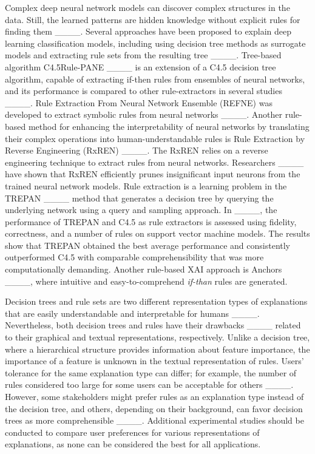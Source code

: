 Complex deep neural network models can discover complex structures in the data. Still, the learned patterns are hidden knowledge without explicit rules for finding them ____. Several approaches have been proposed to explain deep learning classification models, including using decision tree methods as surrogate models and extracting rule sets from the resulting tree ____. Tree-based algorithm C4.5Rule-PANE ____ is an extension of a C4.5 decision tree algorithm, capable of extracting if-then rules from ensembles of neural networks, and its performance is compared to other rule-extractors in several studies ____. Rule Extraction From Neural Network Ensemble (REFNE) was developed to extract symbolic rules from neural networks ____. Another rule-based method for enhancing the interpretability of neural networks by translating their complex operations into human-understandable rules is Rule Extraction by Reverse Engineering (RxREN) ____. The RxREN relies on a reverse engineering technique to extract rules from neural networks. Researchers ____ have shown that RxREN efficiently prunes insignificant input neurons from the trained neural network models. Rule extraction is a learning problem in the TREPAN ____ method that generates a decision tree by querying the underlying network using a query and sampling approach. In ____, the performance of TREPAN and C4.5 as rule extractors is assessed using fidelity, correctness, and a number of rules on support vector machine models. The results show that TREPAN obtained the best average performance and consistently outperformed C4.5 with comparable comprehensibility that was more computationally demanding. Another rule-based XAI approach is Anchors ____, where intuitive and easy-to-comprehend \textit{if-than} rules are generated. 

Decision trees and rule sets are two different representation types of explanations that are easily understandable and interpretable for humans ____. Nevertheless, both decision trees and rules have their drawbacks ____ related to their graphical and textual representations, respectively. Unlike a decision tree, where a hierarchical structure provides information about feature importance, the importance of a feature is unknown in the textual representation of rules. Users' tolerance for the same explanation type can differ; for example, the number of rules considered too large for some users can be acceptable for others ____. However, some stakeholders might prefer rules as an explanation type instead of the decision tree, and others, depending on their background, can favor decision trees as more comprehensible ____. Additional experimental studies should be conducted to compare user preferences for various representations of explanations, as none can be considered the best for all applications.

